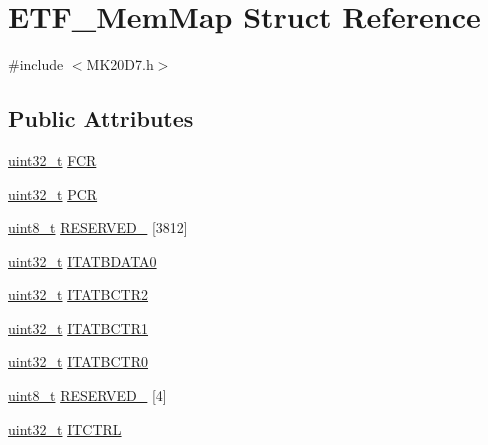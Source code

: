 \hypertarget{struct_e_t_f___mem_map}{}\section{E\+T\+F\+\_\+\+Mem\+Map Struct Reference}
\label{struct_e_t_f___mem_map}


{\ttfamily \#include $<$M\+K20\+D7.\+h$>$}

\subsection*{Public Attributes}
\begin{DoxyCompactItemize}
\item 
\hyperlink{_p_e___types_8h_a33594304e786b158f3fb30289278f5af}{uint32\+\_\+t} \hyperlink{struct_e_t_f___mem_map_ad893993c7fca4a17b0e50d48283dc8a4}{F\+CR}
\item 
\hyperlink{_p_e___types_8h_a33594304e786b158f3fb30289278f5af}{uint32\+\_\+t} \hyperlink{struct_e_t_f___mem_map_aa50938e7ba3b91d0bc8417397ef82267}{P\+CR}
\item 
\hyperlink{_p_e___types_8h_aba7bc1797add20fe3efdf37ced1182c5}{uint8\+\_\+t} \hyperlink{struct_e_t_f___mem_map_ab16885d51713a1a31348e305c0c2e66d}{R\+E\+S\+E\+R\+V\+E\+D\+\_} \mbox{[}3812\mbox{]}
\item 
\hyperlink{_p_e___types_8h_a33594304e786b158f3fb30289278f5af}{uint32\+\_\+t} \hyperlink{struct_e_t_f___mem_map_ab9991b5782efe3ff465d49f40ed0bbfa}{I\+T\+A\+T\+B\+D\+A\+T\+A0}
\item 
\hyperlink{_p_e___types_8h_a33594304e786b158f3fb30289278f5af}{uint32\+\_\+t} \hyperlink{struct_e_t_f___mem_map_ab6920fa131f508ff5a9b6817be95bed5}{I\+T\+A\+T\+B\+C\+T\+R2}
\item 
\hyperlink{_p_e___types_8h_a33594304e786b158f3fb30289278f5af}{uint32\+\_\+t} \hyperlink{struct_e_t_f___mem_map_a43cd2057b8fcb847375a18e4638f923e}{I\+T\+A\+T\+B\+C\+T\+R1}
\item 
\hyperlink{_p_e___types_8h_a33594304e786b158f3fb30289278f5af}{uint32\+\_\+t} \hyperlink{struct_e_t_f___mem_map_a25f602259e8235c0a7d5a95d27a0ad8d}{I\+T\+A\+T\+B\+C\+T\+R0}
\item 
\hyperlink{_p_e___types_8h_aba7bc1797add20fe3efdf37ced1182c5}{uint8\+\_\+t} \hyperlink{struct_e_t_f___mem_map_a38b3c3aa17a376b5b6d4010096034d9d}{R\+E\+S\+E\+R\+V\+E\+D\+\_} \mbox{[}4\mbox{]}
\item 
\hyperlink{_p_e___types_8h_a33594304e786b158f3fb30289278f5af}{uint32\+\_\+t} \hyperlink{struct_e_t_f___mem_map_a287d5070161434a42360e126bd310a1a}{I\+T\+C\+T\+RL}

\end{DoxyCompactItemize}
